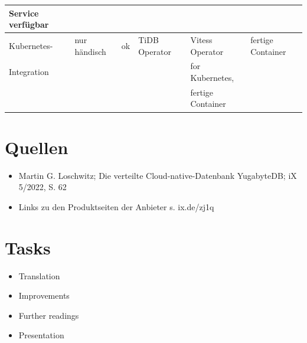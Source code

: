 \begin{table}
{\begin{tabular}{l|l|l|l|l|l}
    Service verfügbar &                     &                             &                               &                 & \\ \hline 
    Kubernetes-   & nur händisch            & ok                          & TiDB Operator                 & Vitess Operator & fertige Container \\
    Integration   &                         &                             &                               & for Kubernetes, & \\
                  &                         &                             &                               & fertige Container & \\
  \end{tabular}
}

\end{table}

\section{Quellen}

\begin{itemize}
  \item Martin G. Loschwitz; Die verteilte Cloud-native-Datenbank YugabyteDB; iX 5/2022, S. 62
  \item Links zu den Produktseiten der Anbieter s. ix.de/zj1q
\end{itemize}

\section{Tasks}


\begin{itemize}
	\item Translation
	\item Improvements
	\item Further readings
	\item Presentation
\end{itemize}

